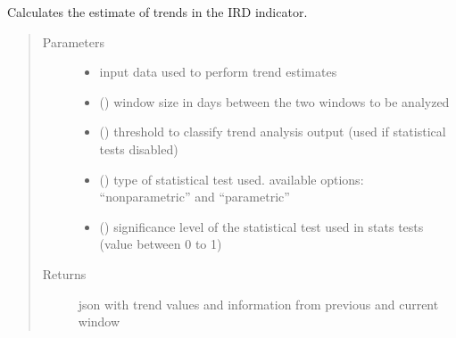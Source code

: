\documentclass[letterpaper,10pt,english]{sphinxmanual}
\begin{document}

\begin{fulllineitems}
\label{\detokenize{algorithms:algorithms.eti.eti.calc_eti_ird}}
\sphinxAtStartPar
Calculates the estimate of trends in the IRD indicator.
\begin{quote}\begin{description}
\item[{Parameters}] \leavevmode\begin{itemize}
\item {} 
\sphinxAtStartPar
{} \textendash{} input data used to perform trend estimates

\item {} 
\sphinxAtStartPar
{} () \textendash{} window size in days between the two windows to be analyzed

\item {} 
\sphinxAtStartPar
{} () \textendash{} threshold to classify trend analysis output (used if statistical tests disabled)

\item {} 
\sphinxAtStartPar
{} () \textendash{} type of statistical test used. available options: “nonparametric” and “parametric”

\item {} 
\sphinxAtStartPar
{} () \textendash{} significance level of the statistical test used in stats tests (value between 0 to 1)

\end{itemize}

\item[{Returns}] \leavevmode
\sphinxAtStartPar
json with trend values and information from previous and current window

\end{description}\end{quote}

\end{fulllineitems}
\end{document}
